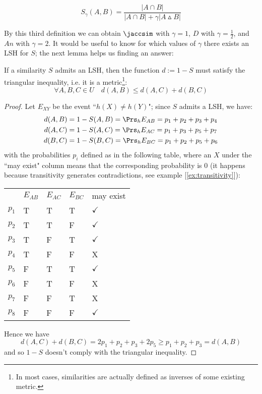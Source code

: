 \begin{defn}
	\begin{equation}
	\displaystyle S_\gamma(A, B) = \frac{|A\cap B|}{|A\cap B| + \gamma|A\vartriangle B|}
	\end{equation}
\end{defn}

By this third definition we can obtain $\jaccsim$ with $\gamma = 1$, $D$ with $\gamma=\frac{1}{2}$, and $An$ with $\gamma = 2$. It would be useful to know for which values of $\gamma$ there exists an LSH for $S$; the next lemma helps us finding an answer:

\begin{lem}[Charikar]
	If a similarity $S$ admits an LSH, then the function $d := 1 - S$ must satisfy the triangular inequality, i.e. it is a metric\footnote{In most cases, similarities are actually defined as inverses of some existing metric.}:
	\[
		\forall A, B, C \in U \quad d(A, B) \leq d(A, C) + d(B, C)
	\]
\end{lem}

\begin{proof}
	Let $E_{XY}$ be the event ``$h(X) \neq h(Y)$"; since $S$ admits a LSH, we have:
	\begin{align*}
		d(A,B) &= 1-S(A,B) = \Prs_h{E_{AB}} = p_1 + p_2 + p_3 + p_4 \\
		d(A,C) &= 1-S(A,C) = \Prs_h{E_{AC}} = p_1 + p_3 + p_5 + p_7 \\
		d(B,C) &= 1-S(B,C) = \Prs_h{E_{BC}} = p_1 + p_2 + p_5 + p_6
	\end{align*}
	with the probabilities $p_i$ defined as in the following table, where an $X$ under the ``may exist" column means that the corresponding probability is $0$ (it happens because transitivity generates contradictions, see example [\ref{ex:transitivity}]):

	\vspace{1ex}
	\begin{tabular}{lllll}
		& $E_{AB}$ & $E_{AC}$ & $E_{BC}$ & may exist             \\
		$p_1$ & T         & T         & T         & $\checkmark$ \\
		$p_2$ & T         & T         & F         & $\checkmark$ \\
		$p_3$ & T         & F         & T         & $\checkmark$ \\
		$p_4$ & T         & F         & F         & X            \\
		$p_5$ & F         & T         & T         & $\checkmark$ \\
		$p_6$ & F         & T         & F         & X            \\
		$p_7$ & F         & F         & T         & X            \\
		$p_8$ & F         & F         & F         & $\checkmark$
	\end{tabular}

	Hence we have
	\begin{equation*}
		d(A,C) + d(B,C) = 2p_1 + p_2 + p_3 + 2p_5 \geq p_1 + p_2 + p_3 = d(A,B)
	\end{equation*}
	and so $1-S$ doesn't comply with the triangular inequality.
\end{proof}

